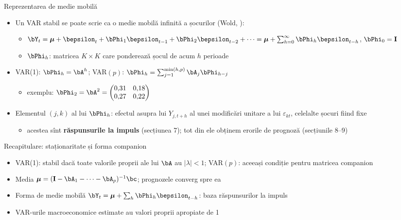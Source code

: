 \begin{frame}{Reprezentarea de medie mobilă}
\itemsize{\small}
\begin{itemize}
    \item Un VAR stabil se poate scrie ca o medie mobilă infinită a șocurilor (Wold, ):
    \begin{itemize}
        \item $\bY_t = \boldsymbol{\mu} + \bepsilon_t + \bPhi_1\bepsilon_{t-1} + \bPhi_2\bepsilon_{t-2} + \dots = \boldsymbol{\mu} + \sum_{h=0}^{\infty}\bPhi_h\bepsilon_{t-h}$, $\bPhi_0 = \mathbf{I}$
        \item $\bPhi_h$: matricea $K \times K$ care ponderează șocul de acum $h$ perioade
    \end{itemize}
    \item VAR(1): $\bPhi_h = \bA^h$; VAR$(p)$: $\bPhi_h = \sum_{j=1}^{\min(h,p)}\bA_j\bPhi_{h-j}$
    \begin{itemize}
        \item exemplu: $\bPhi_2 = \bA^2 = \begin{pmatrix} 0{,}31 & 0{,}18 \\ 0{,}27 & 0{,}22 \end{pmatrix}$
    \end{itemize}
    \item Elementul $(j, k)$ al lui $\bPhi_h$: efectul asupra lui $Y_{j,t+h}$ al unei modificări unitare a lui $\varepsilon_{kt}$, celelalte șocuri fiind fixe
    \begin{itemize}
        \item acestea sînt \textbf{răspunsurile la impuls} (secțiunea 7); tot din ele obținem erorile de prognoză (secțiunile 8--9)
    \end{itemize}
\end{itemize}
\end{frame}

\begin{frame}{Recapitulare: staționaritate și forma companion}
\itemsize{\small}
\begin{itemize}
    \item VAR(1): stabil dacă toate valorile proprii ale lui $\bA$ au $|\lambda| < 1$; VAR$(p)$: aceeași condiție pentru matricea companion
    \item Media $\boldsymbol{\mu} = (\mathbf{I} - \bA_1 - \dots - \bA_p)^{-1}\bc$; prognozele converg spre ea
    \item Forma de medie mobilă $\bY_t = \boldsymbol{\mu} + \sum_h\bPhi_h\bepsilon_{t-h}$: baza răspunsurilor la impuls
    \item VAR-urile macroeconomice estimate au valori proprii apropiate de 1
\end{itemize}
\end{frame}


